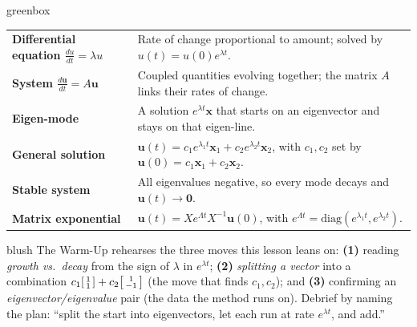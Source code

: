 \documentclass[10pt]{article}
\newcommand{\uu}{\mathbf{u}}
\newcommand{\xx}{\mathbf{x}}
\newcommand{\zero}{\mathbf{0}}
\begin{document}
\begin{skillbox}{greenbox}
\renewcommand{\arraystretch}{1.3}
\begin{tabularx}{\linewidth}{@{}l X@{}}
\textbf{Differential equation $\frac{du}{dt}=\lambda u$} & Rate of change proportional to amount; solved by $u(t)=u(0)e^{\lambda t}$. \\
\textbf{System $\frac{d\uu}{dt}=A\uu$} & Coupled quantities evolving together; the matrix $A$ links their rates of change. \\
\textbf{Eigen-mode} & A solution $e^{\lambda t}\xx$ that starts on an eigenvector and stays on that eigen-line. \\
\textbf{General solution} & $\uu(t)=c_1e^{\lambda_1 t}\xx_1+c_2e^{\lambda_2 t}\xx_2$, with $c_1,c_2$ set by $\uu(0)=c_1\xx_1+c_2\xx_2$. \\
\textbf{Stable system} & All eigenvalues negative, so every mode decays and $\uu(t)\to\zero$. \\
\textbf{Matrix exponential} & $\uu(t)=Xe^{\Lambda t}X^{-1}\uu(0)$, with $e^{\Lambda t}=\mathrm{diag}(e^{\lambda_1 t},e^{\lambda_2 t})$. \\
\end{tabularx}
\end{skillbox}

\begin{fixedskillbox}{blush}
    The Warm-Up rehearses the three moves this lesson leans on: \textbf{(1)} reading \emph{growth vs.\ decay}
    from the sign of $\lambda$ in $e^{\lambda t}$; \textbf{(2)} \emph{splitting a vector} into a combination
    $c_1\begin{bsmallmatrix}1\\1\end{bsmallmatrix}+c_2\begin{bsmallmatrix}1\\-1\end{bsmallmatrix}$ (the move that
    finds $c_1,c_2$); and \textbf{(3)} confirming an \emph{eigenvector/eigenvalue} pair (the data the method
    runs on). Debrief by naming the plan: ``split the start into eigenvectors, let each run at rate
    $e^{\lambda t}$, and add.''
\end{fixedskillbox}
\end{document}
